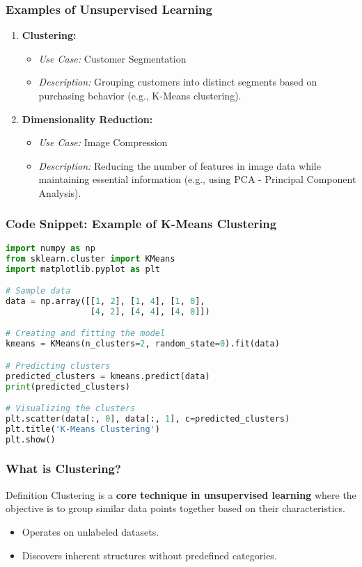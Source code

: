 \documentclass[aspectratio=169]{beamer}
\begin{document}
\begin{frame}[fragile]
    \frametitle{Examples of Unsupervised Learning}
    \begin{enumerate}
        \item \textbf{Clustering:}
            \begin{itemize}
                \item \textit{Use Case:} Customer Segmentation
                \item \textit{Description:} Grouping customers into distinct segments based on purchasing behavior (e.g., K-Means clustering).
            \end{itemize}
        
        \item \textbf{Dimensionality Reduction:}
            \begin{itemize}
                \item \textit{Use Case:} Image Compression
                \item \textit{Description:} Reducing the number of features in image data while maintaining essential information (e.g., using PCA - Principal Component Analysis).
            \end{itemize}
    \end{enumerate}
\end{frame}

\begin{frame}[fragile]
    \frametitle{Code Snippet: Example of K-Means Clustering}
    \begin{lstlisting}[language=Python]
import numpy as np
from sklearn.cluster import KMeans
import matplotlib.pyplot as plt

# Sample data
data = np.array([[1, 2], [1, 4], [1, 0],
                 [4, 2], [4, 4], [4, 0]])

# Creating and fitting the model
kmeans = KMeans(n_clusters=2, random_state=0).fit(data)

# Predicting clusters
predicted_clusters = kmeans.predict(data)
print(predicted_clusters)

# Visualizing the clusters
plt.scatter(data[:, 0], data[:, 1], c=predicted_clusters)
plt.title('K-Means Clustering')
plt.show()
    \end{lstlisting}
\end{frame}

\begin{frame}[fragile]
    \frametitle{What is Clustering?}
    \begin{block}{Definition}
        Clustering is a \textbf{core technique in unsupervised learning} where the objective is to group similar data points together based on their characteristics. 
    \end{block}
    \begin{itemize}
        \item Operates on unlabeled datasets.
        \item Discovers inherent structures without predefined categories.
    \end{itemize}
\end{frame}
\end{document}
